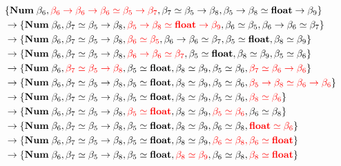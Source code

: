 \documentclass[12pt]{article}
\begin{document}
\pagestyle{empty}

\begin{align*}
    &\{\mathbf{Num}\; \beta_6, {\color{red} \beta_6 \to \beta_6 \to \beta_6 \simeq \beta_5 \to \beta_7}, \beta_7 \simeq \beta_5 \to \beta_8, \beta_5 \to \beta_8 \simeq \mathbf{float} \to \beta_9\} \\
    &\to \{\mathbf{Num}\; \beta_6, \beta_7 \simeq \beta_5 \to \beta_8, {\color{red} \beta_5 \to \beta_8 \simeq \mathbf{float} \to \beta_9}, \beta_6 \simeq \beta_5, \beta_6 \to \beta_6 \simeq \beta_7\} \\
    &\to \{\mathbf{Num}\; \beta_6, \beta_7 \simeq \beta_5 \to \beta_8, {\color{red} \beta_6 \simeq \beta_5}, \beta_6 \to \beta_6 \simeq \beta_7, \beta_5 \simeq \mathbf{float}, \beta_8 \simeq \beta_9\} \\
    &\to \{\mathbf{Num}\; \beta_6, \beta_7 \simeq \beta_5 \to \beta_8, {\color{red} \beta_6 \to \beta_6 \simeq \beta_7}, \beta_5 \simeq \mathbf{float}, \beta_8 \simeq \beta_9, \beta_5 \simeq \beta_6\} \\
    &\to \{\mathbf{Num}\; \beta_6, {\color{red} \beta_7 \simeq \beta_5 \to \beta_8}, \beta_5 \simeq \mathbf{float}, \beta_8 \simeq \beta_9, \beta_5 \simeq \beta_6, {\color{red} \beta_7 \simeq \beta_6 \to \beta_6}\} \\
    &\to \{\mathbf{Num}\; \beta_6, \beta_7 \simeq \beta_5 \to \beta_8, \beta_5 \simeq \mathbf{float}, \beta_8 \simeq \beta_9, \beta_5 \simeq \beta_6, {\color{red} \beta_5 \to \beta_8 \simeq \beta_6 \to \beta_6}\} \\
    &\to \{\mathbf{Num}\; \beta_6, \beta_7 \simeq \beta_5 \to \beta_8, \beta_5 \simeq \mathbf{float}, \beta_8 \simeq \beta_9, \beta_5 \simeq \beta_6, {\color{red} \beta_8 \simeq \beta_6}\} \\
    &\to \{\mathbf{Num}\; \beta_6, \beta_7 \simeq \beta_5 \to \beta_8, {\color{red} \beta_5 \simeq \mathbf{float}}, \beta_8 \simeq \beta_9, {\color{red} \beta_5 \simeq \beta_6}, \beta_6 \simeq \beta_8\} \\
    &\to \{\mathbf{Num}\; \beta_6, \beta_7 \simeq \beta_5 \to \beta_8, \beta_5 \simeq \mathbf{float}, \beta_8 \simeq \beta_9, \beta_6 \simeq \beta_8, {\color{red} \mathbf{float} \simeq \beta_6}\} \\
    &\to \{\mathbf{Num}\; \beta_6, \beta_7 \simeq \beta_5 \to \beta_8, \beta_5 \simeq \mathbf{float}, \beta_8 \simeq \beta_9, {\color{red} \beta_6 \simeq \beta_8, \beta_6 \simeq \mathbf{float}}\} \\
    &\to \{\mathbf{Num}\; \beta_6, \beta_7 \simeq \beta_5 \to \beta_8, \beta_5 \simeq \mathbf{float}, {\color{red} \beta_8 \simeq \beta_9}, \beta_6 \simeq \beta_8, {\color{red} \beta_8 \simeq \mathbf{float}}\} \\

\end{align*}
\end{document}

